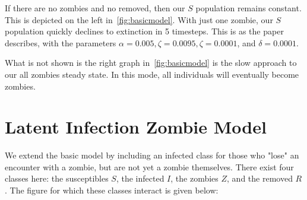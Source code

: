 \documentclass[]{article}
\begin{document}
If there are no zombies and no removed, then our $S$ population remains constant. This is depicted on the left in~\autoref{fig:basicmodel}.
With just one zombie, our $S$ population quickly declines to extinction in 5 timesteps. This is as the paper describes, with the parameters $\alpha = 0.005, \zeta = 0.0095, \zeta = 0.0001$, and $\delta = 0.0001$.

\begin{figure}[H]
\end{figure}

What is not shown is the right graph in~\autoref{fig:basicmodel} is the slow approach to our all zombies steady state. In this mode, all individuals will eventually become zombies.

\section{Latent Infection Zombie Model}
We extend the basic model by including an infected class for those who "lose" an encounter with a zombie, but are not yet a zombie themselves. There exist four classes here: the susceptibles $S$, the infected $I$, the zombies $Z$, and the removed $R$. The figure for which these classes interact is given below:

\begin{figure}[H]
\end{figure}
\end{document}
